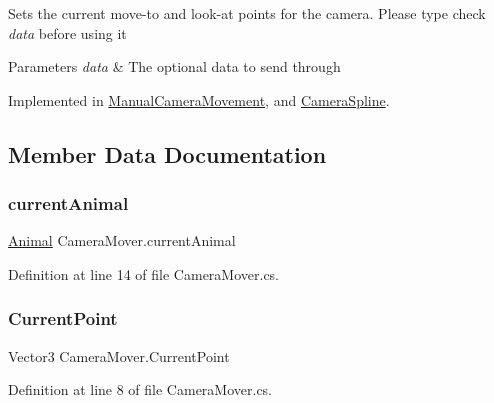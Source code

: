 Sets the current move-\/to and look-\/at points for the camera. Please type check {\itshape data}  before using it 


\begin{DoxyParams}{Parameters}
{\em data} & The optional data to send through\\
\hline
\end{DoxyParams}


Implemented in \mbox{\hyperlink{class_manual_camera_movement_a5c0dbb93ee2c14d66e55c1ce090a8bb4}{Manual\+Camera\+Movement}}, and \mbox{\hyperlink{class_camera_spline_a8ff1f479307c63e3ecc75d089ff1bfcf}{Camera\+Spline}}.



\subsection{Member Data Documentation}
\mbox{\label{class_camera_mover_a8b863da058e5a1984fd686e09ee2689f}} 
\subsubsection{\texorpdfstring{current\+Animal}{currentAnimal}}
{\footnotesize\ttfamily \mbox{\hyperlink{class_animal}{Animal}} Camera\+Mover.\+current\+Animal\hspace{0.3cm}{\ttfamily [protected]}}



Definition at line 14 of file Camera\+Mover.\+cs.

\mbox{\label{class_camera_mover_af5e137b14fa9ab77c866f8eb5c961373}} 
\subsubsection{\texorpdfstring{Current\+Point}{CurrentPoint}}
{\footnotesize\ttfamily Vector3 Camera\+Mover.\+Current\+Point\hspace{0.3cm}{\ttfamily [static]}}



Definition at line 8 of file Camera\+Mover.\+cs.

\mbox{\label{class_camera_mover_a52c7a78c67f185461d25120f42395db3}} 
